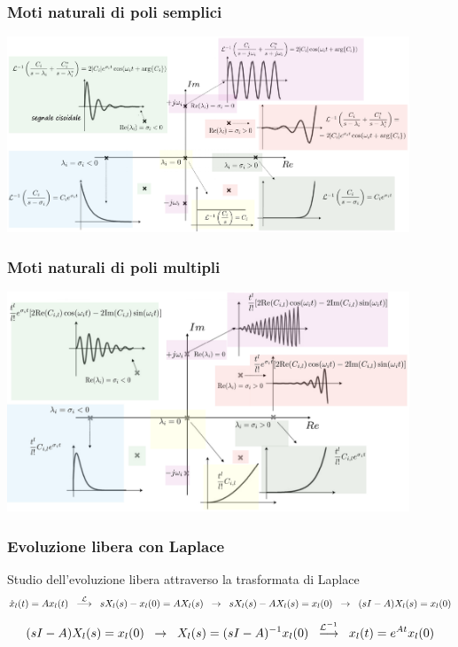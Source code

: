 \subsubsection*{Moti naturali di poli semplici}
\begin{center}
	\includegraphics[width=0.9\textwidth]{immagini/laplace poli semplici.png}
\end{center}

\subsubsection*{Moti naturali di poli multipli}
\begin{center}
	\includegraphics[width=0.9\textwidth]{immagini/laplace poli multipli.png}
\end{center}

\subsubsection*{Evoluzione libera con Laplace}
Studio dell'evoluzione libera attraverso la trasformata di Laplace
\[\dot{x}_l(t) = Ax_l(t) \;\;\stackrel{\mathcal{L}}{\longrightarrow}\;\; sX_l(s) - x_l(0) = AX_l(s) \;\;\rightarrow\;\; sX_l(s)-AX_l(s) = x_l(0) \;\;\rightarrow\;\; (sI-A)X_l(s) = x_l(0)\]
\[(sI-A)X_l(s) = x_l(0) \;\;\rightarrow\;\; X_l(s) = (sI-A)^{-1} x_l(0) \;\;\stackrel{\mathcal{L}^{-1}}{\longrightarrow}\;\; x_l(t) = e^{At} x_l(0)\]

